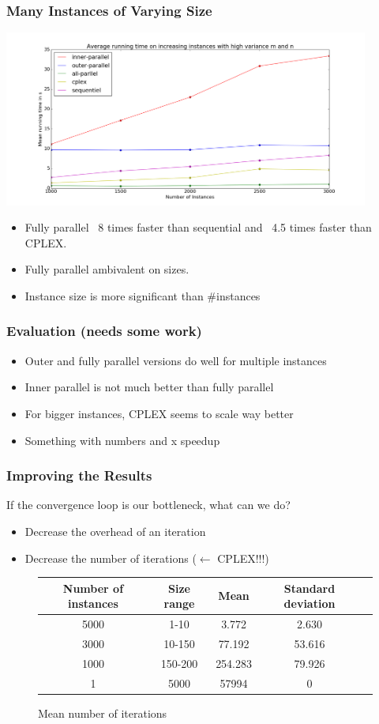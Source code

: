 \documentclass{beamer}
\begin{document}
\begin{frame}[fragile]
\frametitle{Many Instances of Varying Size}
\centering
\includegraphics[width=0.9\textwidth]{../Doc/figures/many-varying}
\begin{itemize}
	\item Fully parallel ~8 times faster than sequential and ~4.5 times faster than CPLEX.
	\item Fully parallel ambivalent on sizes.
	\item Instance size is more significant than \#instances
\end{itemize}
\end{frame}

\begin{frame}
\frametitle{Evaluation (needs some work)}
\begin{itemize}
\item Outer and fully parallel versions do well for multiple instances
\item Inner parallel is not much better than fully parallel
\item For bigger instances, CPLEX seems to scale way better
\item Something with numbers and x speedup
\end{itemize}
\end{frame}

\begin{frame}
\frametitle{Improving the Results}

If the convergence loop is our bottleneck, what can we do?

\begin{itemize}
\item Decrease the overhead of an iteration
\item Decrease the number of iterations ($\leftarrow$ CPLEX!!!)
\end{itemize}

\begin{figure}
\begin{tabular}{|c|c|c|c|c|}
\hline
\textbf{Number of instances} & \textbf{Size range} & \textbf{Mean} & \textbf{Standard deviation} \\\hline
5000 & 1-10 & 3.772 & 2.630 \\\hline
3000 & 10-150 & 77.192 & 53.616 \\\hline
1000 & 150-200 & 254.283 & 79.926 \\\hline
1 & 5000 & 57994 & 0 \\\hline
\end{tabular}
\caption{Mean number of iterations}
\end{figure}
\end{frame}
\end{document}
